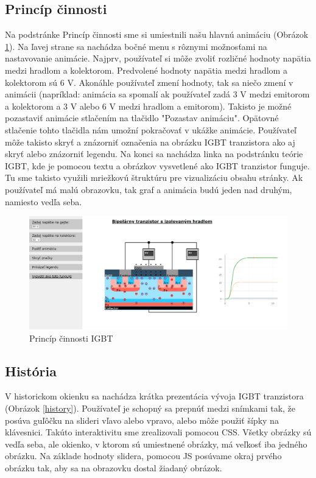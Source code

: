 \subsection{Princíp činnosti}
\noindent Na podstránke Princíp činnosti sme si umiestnili našu hlavnú animáciu (Obrázok \ref{pc}). Na ľavej strane sa nachádza bočné menu s rôznymi možnosťami na nastavovanie animácie. Najprv, používateľ si môže zvoliť rozličné hodnoty napätia medzi hradlom a kolektorom. Predvolené hodnoty napätia medzi hradlom a kolektorom sú  6 V. Akonáhle používateľ zmení hodnoty, tak sa niečo  zmení v animácii (napríklad: animácia sa spomalí ak používateľ zadá 3 V medzi emitorom a kolektorom a 3 V alebo 6 V medzi hradlom a emitorom). Takisto je možné pozastaviť animácie stlačením na tlačidlo "Pozastav animáciu". Opätovné stlačenie tohto tlačidla nám umožní pokračovať v ukážke animácie. Používateľ môže takisto skryť a znázorniť označenia na obrázku \acrshort{IGBT} tranzistora ako aj skryť alebo znázorniť legendu. Na konci sa nachádza linka na podstránku teórie IGBT, kde je pomocou textu a obrázkov vysvetlené ako \acrshort{IGBT} tranzistor funguje. Tu sme takisto využili mriežkovú štruktúru pre vizualizáciu obsahu stránky. Ak používateľ má malú obrazovku, tak graf a animácia  budú jeden nad druhým, namiesto vedľa seba.


\begin{figure}[!htbp]
    \centering
    \includegraphics[width=16cm]{img/pc.PNG}
    \caption{Princíp činnosti IGBT}
    \label{pc}
\end{figure}

\subsection{História}
\noindent V historickom okienku sa nachádza krátka prezentácia vývoja \acrshort{IGBT} tranzistora (Obrázok \ref{history}). Používateľ je schopný sa prepnúť medzi snímkami tak, že posúva guľôčku na slideri vľavo alebo vpravo, alebo môže použiť šípky na klávesnici. Takúto  interaktivitu  sme zrealizovali pomocou CSS. Všetky obrázky sú vedľa seba, ale okienko, v ktorom sú umiestnené obrázky, má veľkosť iba jedného obrázku. Na základe hodnoty slidera, pomocou JS posúvame okraj prvého obrázku tak, aby sa na obrazovku dostal žiadaný obrázok.

